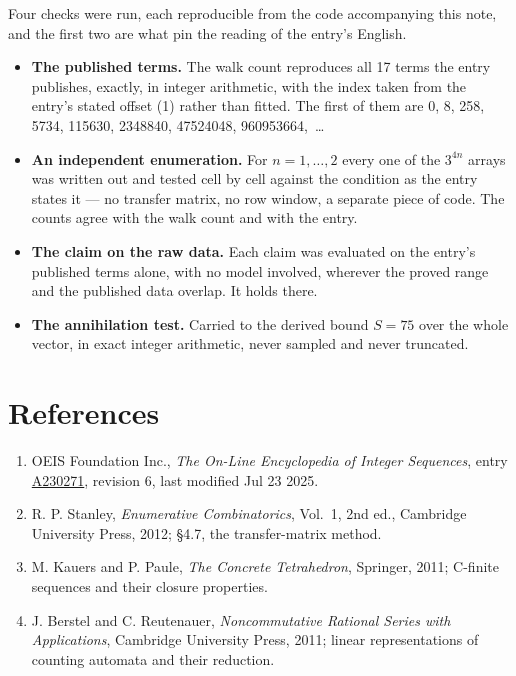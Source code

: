 \documentclass[11pt]{article}
\theoremstyle{definition}
\begin{document}
Four checks were run, each reproducible from the code accompanying this note, and the first two are what pin the reading of the entry's English.

\begin{itemize}

\item {\bfseries The published terms.} The walk count reproduces all 17 terms the entry publishes, exactly, in integer arithmetic, with the index taken from the entry's stated offset (1) rather than fitted. The first of them are 0, 8, 258, 5734, 115630, 2348840, 47524048, 960953664,~\dots

\item {\bfseries An independent enumeration.} For $n = 1,\dots,2$ every one of the $3^{4n}$ arrays was written out and tested cell by cell against the condition as the entry states it --- no transfer matrix, no row window, a separate piece of code. The counts agree with the walk count and with the entry.

\item {\bfseries The claim on the raw data.} Each claim was evaluated on the entry's published terms alone, with no model involved, wherever the proved range and the published data overlap. It holds there.

\item {\bfseries The annihilation test.} Carried to the derived bound $S = 75$ over the whole vector, in exact integer arithmetic, never sampled and never truncated.

\end{itemize}

\section{References}

\begin{enumerate}

\item OEIS Foundation Inc., \emph{The On-Line Encyclopedia of Integer Sequences}, entry \href{https://oeis.org/A230271}{A230271}, revision 6, last modified Jul 23 2025.

\item R. P. Stanley, \emph{Enumerative Combinatorics}, Vol.~1, 2nd ed., Cambridge University Press, 2012; \S4.7, the transfer-matrix method.

\item M. Kauers and P. Paule, \emph{The Concrete Tetrahedron}, Springer, 2011; C-finite sequences and their closure properties.

\item J. Berstel and C. Reutenauer, \emph{Noncommutative Rational Series with Applications}, Cambridge University Press, 2011; linear representations of counting automata and their reduction.

\end{enumerate}
\end{document}
